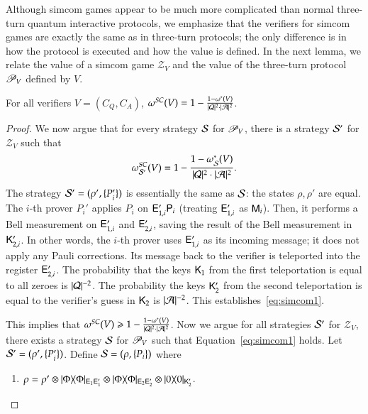 \medskip
\vspace{10pt}

Although simcom games appear to be much more complicated than normal three-turn quantum interactive protocols, we emphasize that the verifiers for simcom games are exactly the same as in three-turn protocols; the only difference is in how the protocol is executed and how the value is defined. In the next lemma, we relate the value of a simcom game $\mathscr{Z}_V$ and the value of the three-turn protocol $\mathscr{P}_V$ defined by $V$.

\begin{lemma}
\label{lem:convert_to_simcom}
	For all verifiers $V = (C_Q,C_A)$, $\omega^{SC}(V) = 1 - \frac{1 - \omega^*(V)}{|\mathcal Q|^2 \cdot |\mathcal A|^2}$. 
\end{lemma}
\begin{proof}
	We now argue that for every strategy $\mathcal{S}$ for $\mathscr{P}_V$, there is a strategy $\mathcal{S}'$ for $\mathscr{Z}_V$ such that
	\begin{equation}
	\label{eq:simcom1}
		\omega^{SC}_{\strat'}(V) = 1 - \frac{1 - \omega^*_\strat(V)}{|\cQ|^2 \cdot |\cA|^2}.
	\end{equation}
	The strategy $\mathcal{S}' = (\rho',\{P_i'\})$ is essentially the same as $\mathcal{S}$: the states $\rho,\rho'$ are equal. The $i$-th prover $P_i'$ applies $P_i$ on ${\mathsf{E}}_{1,i}' {\mathsf{P}}_i$ (treating ${\mathsf{E}}_{1,i}'$ as ${\mathsf{M}}_i$). Then, it performs a Bell measurement on ${\mathsf{E}}_{1,i}'$ and ${\mathsf{E}}_{2,i}'$, saving the result of the Bell measurement in ${\mathsf{K}}_{2,i}'$. In other words, the $i$-th prover uses ${\mathsf{E}}_{1,i}'$ as its incoming message; it does not apply any Pauli corrections. Its message back to the verifier is teleported into the register ${\mathsf{E}}_{2,i}'$. The probability that the keys ${\mathsf{K}}_1$ from the first teleportation is equal to all zeroes is $|\mathcal Q|^{-2}$. The probability the keys ${\mathsf{K}}_2'$ from the second teleportation is equal to the verifier's guess in ${\mathsf{K}}_2$ is $|\mathcal A|^{-2}$. This establishes~\eqref{eq:simcom1}.
	
	This implies that $\omega^{SC}(V) \geqslant 1 - \frac{1 - \omega^*(V)}{|\mathcal Q|^2 \cdot |\mathcal A|^2}$. Now we argue for all strategies $\mathcal{S}'$ for $\mathscr{Z}_{V}$, there exists a strategy $\mathcal{S}$ for $\mathscr{P}_V$ such that Equation~\eqref{eq:simcom1} holds. Let $\mathcal{S}' = (\rho',\{ P_i' \})$. Define $\mathcal{S} = (\rho,\{P_i\})$ where
	\begin{enumerate}
		\item $\rho = \rho' \otimes |\Phi\rangle\! \langle \Phi|_{{\mathsf{E}}_1 {\mathsf{E}}_1'} \otimes |\Phi\rangle\! \langle \Phi|_{{\mathsf{E}}_2 {\mathsf{E}}_2'} \otimes |0\rangle\! \langle 0|_{{\mathsf{K}}_2'}$. 
		

\end{enumerate}
\end{proof}
